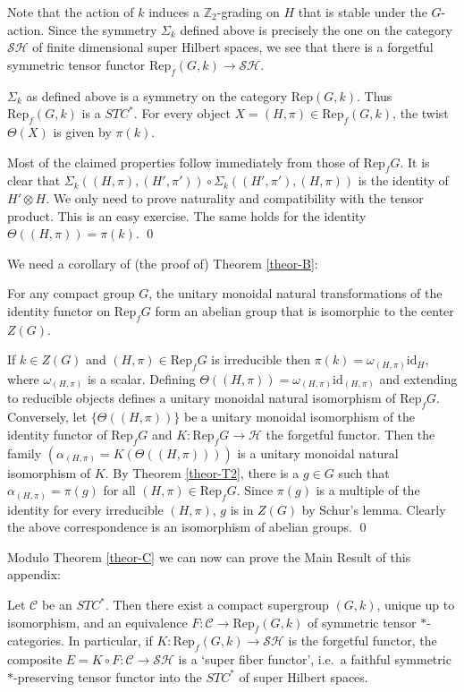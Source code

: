 \documentclass[12pt]{article}
\newenvironment{bxd}%
  {\bigskip\noindent\begin{Sbox}\begin{minipage}{0.9\textwidth} }%
  {\end{minipage}\end{Sbox}\fbox{\TheSbox}\bigskip}%
\theoremstyle{definition}
\theoremstyle{definition}
\theoremstyle{remark}
\def\2#1{{\mathcal #1}}
\def\7#1{{\mathbb #1}}
\newcommand{\Rep}{\mathrm{Rep}}
\newcommand{\rarr}{\rightarrow}
\def\id{\mathrm{id}}
\begin{document}
\brem Note that the action of $k$ induces a $\7Z_2$-grading on $H$ that is stable under the
$G$-action. Since the symmetry $\Sigma_k$ defined above is precisely the one on the category
$\2S\2H$ of finite dimensional super Hilbert spaces, we see that there is a forgetful symmetric
tensor functor $\Rep_f(G,k)\rarr\2S\2H$.
\erem

\blemma
$\Sigma_k$ as defined above is a symmetry on the category $\Rep(G,k)$. Thus $\Rep_f(G,k)$ is a
$STC^*$. For every object $X=(H,\pi)\in\Rep_f(G,k)$, the twist $\Theta(X)$ is given by $\pi(k)$.
\elemma

\prf Most of the claimed properties follow immediately from those of $\Rep_fG$. 
It is clear that $\Sigma_k((H,\pi),(H',\pi'))\circ\Sigma_k((H',\pi'),(H,\pi))$ is the identity
of $H'\otimes H$. We only need to prove naturality and compatibility with the tensor product. This
is an easy exercise. The same holds for the identity $\Theta((H,\pi))=\pi(k)$.
\qed

We need a corollary of (the proof of) Theorem \ref{theor-B}:

\bcoro \label{coro-twist}
For any compact group $G$, the unitary monoidal natural transformations of the identity functor on
$\Rep_fG$ form an abelian group that is isomorphic to the center $Z(G)$.
\ecoro

\prf If $k\in Z(G)$ and $(H,\pi)\in\Rep_fG$ is irreducible then $\pi(k)=\omega_{(H,\pi)}\id_H$, where  
$\omega_{(H,\pi)}$ is a scalar. Defining $\Theta((H,\pi))=\omega_{(H,\pi)}\id_{(H,\pi)}$ and
extending to reducible objects defines a unitary monoidal natural isomorphism of $\Rep_fG$.
Conversely, let $\{\Theta((H,\pi))\}$ be a unitary monoidal isomorphism of the identity functor of
$\Rep_fG$ and $K:\Rep_fG\rarr\2H$ the forgetful functor. Then the family 
$(\alpha_{(H,\pi)}=K(\Theta((H,\pi))))$ is a unitary monoidal natural isomorphism of $K$. By Theorem
\ref{theor-T2}, there is a $g\in G$ such that $\alpha_{(H,\pi)}=\pi(g)$ for all
$(H,\pi)\in\Rep_fG$. Since $\pi(g)$ is a multiple of the identity for every irreducible $(H,\pi)$,
$g$ is in $Z(G)$ by Schur's lemma. Clearly the above correspondence is an isomorphism of abelian
groups. 
\qed

Modulo Theorem \ref{theor-C} we can now can prove the Main Result of this appendix:

\begin{bxd}
\btheor \label{theor-A}   
Let $\2C$ be an $STC^*$. Then there exist a compact supergroup $(G,k)$, unique up to isomorphism,
and an equivalence $F:\2C\rarr\Rep_f(G,k)$ of symmetric tensor $*$-categories. In particular, if
$K:\Rep_f(G,k)\rarr\2S\2H$ is the forgetful functor, the composite $E=K\circ F:\2C\rarr\2S\2H$ is a
`super fiber functor', i.e.\ a faithful symmetric $*$-preserving tensor functor into the $STC^*$ of
super Hilbert spaces.
\etheor
\end{bxd}
\end{document}
